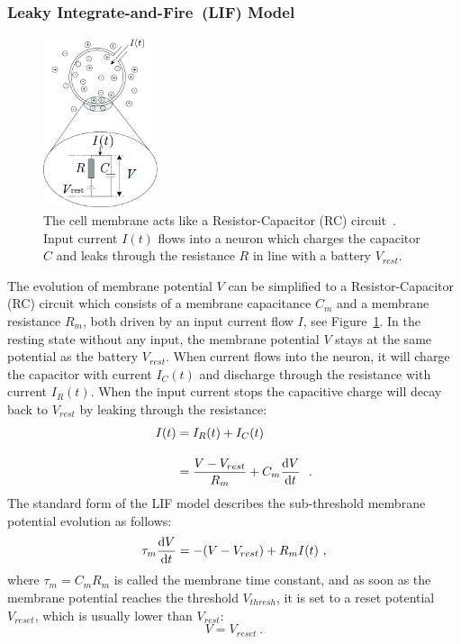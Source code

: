 \subsubsection{Leaky Integrate-and-Fire~(LIF) Model}

\begin{figure}[tb!]
	\centering
	\includegraphics[width=0.3\textwidth]{pics_snn/RC.png}
	\caption[The cell membrane acts like a RC circuit~\citep{gerstner2014neuronal}.]
	{The cell membrane acts like a Resistor-Capacitor (RC) circuit~\citep{gerstner2014neuronal}.
	Input current $I(t)$ flows into a neuron which charges the capacitor $C$ and leaks through the resistance $R$ in line with a battery $V_{rest}$.}
	\label{Fig:rc}
\end{figure}

The evolution of membrane potential $V$ can be simplified to a Resistor-Capacitor (RC) circuit which consists of a membrane capacitance $C_m$ and a membrane resistance $R_m$, both driven by an input current flow $I$, see Figure~\ref{Fig:rc}.
In the resting state without any input, the membrane potential $V$ stays at the same potential as the battery $V_{rest}$.
When current flows into the neuron, it will charge the capacitor with current $I_C(t)$ and discharge through the resistance with current $I_R(t)$.
When the input current stops the capacitive charge will decay back to $V_{rest}$ by leaking through the resistance:
\begin{equation}
\begin{aligned}
	I(t) &= I_R(t) + I_C(t) \\[10pt]
	&= \dfrac{V-V_{rest}}{R_m} + C_m \dfrac{\mathrm{d} V}{\mathrm{d} t}~~.
\end{aligned}
\label{equ:LIF_current}
\end{equation}
The standard form of the LIF model describes the sub-threshold membrane potential evolution as follows:
\begin{equation}
	\tau_m \dfrac{\mathrm{d} V}{\mathrm{d} t} = -(V-V_{rest}) + R_m I(t)~,
\end{equation}
where $\tau_m = C_m R_m$ is called the membrane time constant, and as soon as the membrane potential reaches the threshold $V_{thresh}$, it is set to a reset potential $V_{reset}$, which is usually lower than $V_{rest}$: 
\begin{equation}
V = V_{reset}~.
\end{equation}

